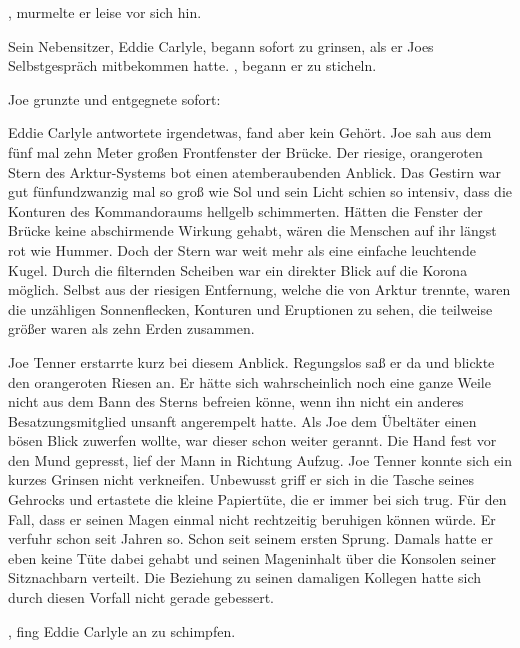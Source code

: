 , murmelte er leise vor sich hin.
\par
Sein Nebensitzer, Eddie Carlyle, begann sofort zu grinsen, als er Joes Selbstgespräch mitbekommen hatte. , begann er zu sticheln.
\par
Joe grunzte und entgegnete sofort: 
\par
Eddie Carlyle antwortete irgendetwas, fand aber kein Gehört.
Joe sah aus dem fünf mal zehn Meter großen Frontfenster der Brücke.
Der riesige, orangeroten Stern des Arktur-Systems bot einen atemberaubenden Anblick.
Das Gestirn war gut fünfundzwanzig mal so groß wie Sol und sein Licht schien so intensiv, dass die Konturen des Kommandoraums hellgelb schimmerten.
Hätten die Fenster der Brücke keine abschirmende Wirkung gehabt, wären die Menschen auf ihr längst rot wie Hummer.
Doch der Stern war weit mehr als eine einfache leuchtende Kugel.
Durch die filternden Scheiben war ein direkter Blick auf die Korona möglich.
Selbst aus der riesigen Entfernung, welche die  von Arktur trennte, waren die unzähligen Sonnenflecken, Konturen und Eruptionen zu sehen, die teilweise größer waren als zehn Erden zusammen.
\par
Joe Tenner erstarrte kurz bei diesem Anblick.
Regungslos saß er da und blickte den orangeroten Riesen an.
Er hätte sich wahrscheinlich noch eine ganze Weile nicht aus dem Bann des Sterns befreien könne, wenn ihn nicht ein anderes Besatzungsmitglied unsanft angerempelt hatte.
Als Joe dem Übeltäter einen bösen Blick zuwerfen wollte, war dieser schon weiter gerannt.
Die Hand fest vor den Mund gepresst, lief der Mann in Richtung Aufzug.
Joe Tenner konnte sich ein kurzes Grinsen nicht verkneifen.
Unbewusst griff er sich in die Tasche seines Gehrocks und ertastete die kleine Papiertüte, die er immer bei sich trug.
Für den Fall, dass er seinen Magen einmal nicht rechtzeitig beruhigen können würde.
Er verfuhr schon seit Jahren so. Schon seit seinem ersten Sprung.
Damals hatte er eben keine Tüte dabei gehabt und seinen Mageninhalt über die Konsolen seiner Sitznachbarn verteilt.
Die Beziehung zu seinen damaligen Kollegen hatte sich durch diesen Vorfall nicht gerade gebessert.
\par
{}, fing Eddie Carlyle an zu schimpfen. 
